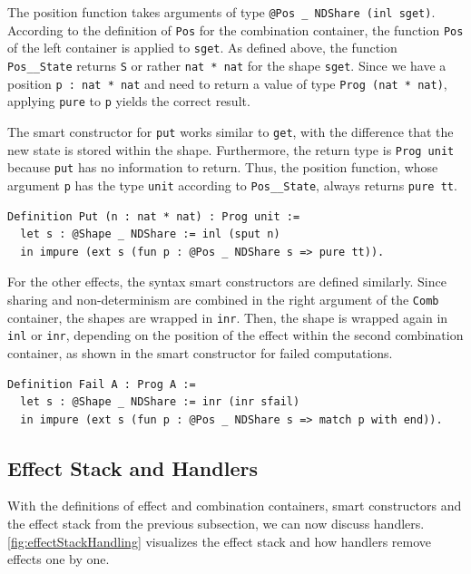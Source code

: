 \documentclass[a4paper, 11pt, fleqn, twoside]{scrreprt}
\newcommand{\hinl}[1]{\texttt{#1}}
\newcommand{\cinl}[1]{\texttt{#1}}
\begin{document}
The position function takes arguments of type \cinl{@Pos _ NDShare (inl sget)}.
According to the definition of \cinl{Pos} for the combination container, the function \cinl{Pos} of the left container is applied to \cinl{sget}.
As defined above, the function \cinl{Pos__State} returns \cinl{S} or rather \cinl{nat * nat} for the shape \cinl{sget}.
Since we have a position \cinl{p : nat * nat} and need to return a value of type \cinl{Prog (nat * nat)}, applying \cinl{pure} to \cinl{p} yields the correct result.

The smart constructor for \hinl{put} works similar to \hinl{get}, with the difference that the new state is stored within the shape.
Furthermore, the return type is \cinl{Prog unit} because \hinl{put} has no information to return.
Thus, the position function, whose argument \cinl{p} has the type \cinl{unit} according to \cinl{Pos__State}, always returns \cinl{pure tt}.

\begin{verbatim}
Definition Put (n : nat * nat) : Prog unit :=
  let s : @Shape _ NDShare := inl (sput n)
  in impure (ext s (fun p : @Pos _ NDShare s => pure tt)).
\end{verbatim}

For the other effects, the syntax smart constructors are defined similarly.
Since sharing and non-determinism are combined in the right argument of the \cinl{Comb} container, the shapes are wrapped in \cinl{inr}.
Then, the shape is wrapped again in \cinl{inl} or \cinl{inr}, depending on the position of the effect within the second combination container, as shown in the smart constructor for failed computations.

\begin{verbatim}
Definition Fail A : Prog A :=
  let s : @Shape _ NDShare := inr (inr sfail)
  in impure (ext s (fun p : @Pos _ NDShare s => match p with end)).
\end{verbatim}

\subsection{Effect Stack and Handlers}

With the definitions of effect and combination containers, smart constructors and the effect stack from the previous subsection, we can now discuss handlers.
\autoref{fig:effectStackHandling} visualizes the effect stack and how handlers remove effects one by one.
\end{document}
